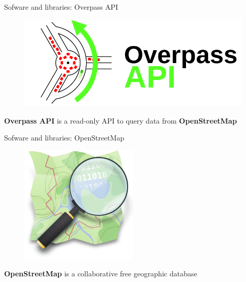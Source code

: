 \documentclass[12pt]{beamer}
\begin{document}
\begin{frame}{Sofware and libraries: Overpass API}
  \begin{figure}[H]
      \centering
      \includegraphics[width=\textwidth]{images/OvAPI_logo.png}
  \end{figure}
  \begin{center}
  \Large \textbf{Overpass API} is a read-only API to query data from \textbf{OpenStreetMap}
  \end{center}
\end{frame}

\begin{frame}{Sofware and libraries: OpenStreetMap}
  \begin{figure}[H]
      \centering
      \includegraphics[width=0.5\textwidth]{images/osm_logo.png}
  \end{figure}
  \begin{center}
  \textbf{OpenStreetMap} is a collaborative free geographic database
  \end{center}
\end{frame}
\end{document}
